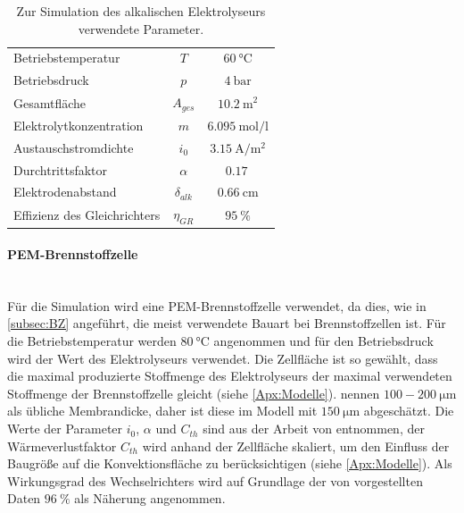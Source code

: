 \begin{table}[ht]
		\centering
		\caption{Zur Simulation des alkalischen Elektrolyseurs verwendete Parameter.}
		\begin{tabular}{l c c}
		\toprule
		Betriebstemperatur & $T$ & $\SI{60}{\degreeCelsius}$\\
		Betriebsdruck & $p$ & $\SI{4}{\bar}$\\
		Gesamtfläche & $A_{ges}$ & $\SI{10,2}{\m\squared }$\\
		Elektrolytkonzentration & $m$ & $\SI{6,095}{\mol \per \l}$\\
		Austauschstromdichte & $i_0$ & $ \SI{3,15}{\A\per\m\squared}$\\
		Durchtrittsfaktor & $\alpha$ & $\SI{0,17}{}$\\
		Elektrodenabstand & $\delta_{alk}$ & $\SI{0,66}{\cm}$\\
		Effizienz des Gleichrichters & $\eta_{GR}$ & $\SI{95}{\%}$ \\
		\bottomrule
		\end{tabular}
		\label{tb:ParameterElektrolyseur}
\end{table}	

\paragraph{PEM-Brennstoffzelle}\ \\
Für die Simulation wird eine PEM-Brennstoffzelle verwendet, da dies, wie in \ref{subsec:BZ} angeführt, die meist verwendete Bauart bei Brennstoffzellen ist. Für die Betriebstemperatur werden $\SI{80}{\degreeCelsius}$ angenommen und für den Betriebsdruck wird der Wert des Elektrolyseurs verwendet. Die Zellfläche ist so gewählt, dass die maximal produzierte Stoffmenge des Elektrolyseurs der maximal verwendeten Stoffmenge der Brennstoffzelle gleicht (siehe \ref{Apx:Modelle}). \citet{rashid_hydrogen_2015} nennen $100-\SI{200}{\micro\m}$ als übliche Membrandicke, daher ist diese im Modell mit $\SI{150}{\micro\m}$ abgeschätzt.
Die Werte der Parameter $i_0$, $\alpha$ und $C_{th}$ sind aus der Arbeit von \citet{webster_implementation_2019} entnommen, der Wärmeverlustfaktor $C_{th}$ wird anhand der Zellfläche skaliert, um den Einfluss der Baugröße auf die Konvektionsfläche zu berücksichtigen (siehe \ref{Apx:Modelle}). 
Als Wirkungsgrad des Wechselrichters wird auf Grundlage der von \citet{trubitsyn_high-efficiency_2010} vorgestellten Daten $\SI{96}{\%}$ als Näherung angenommen.

